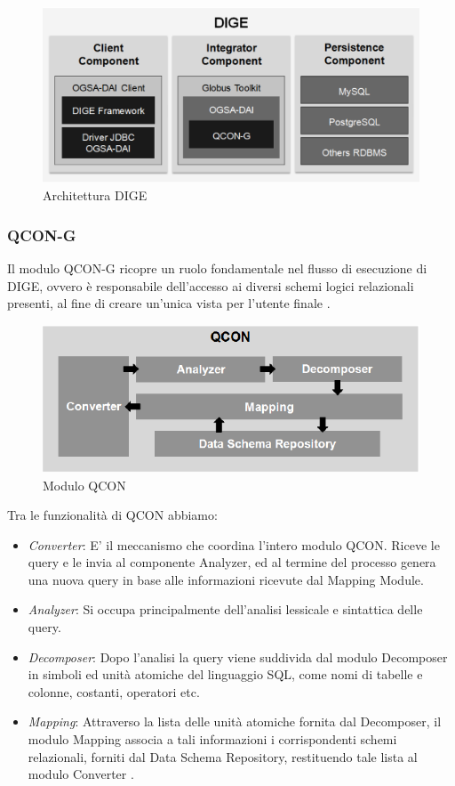 \documentclass[11pt]{article}
\begin{document}
\begin{figure}[H]
	\centering
	\includegraphics[scale=0.50]{images/dige.png}
	\caption{Architettura DIGE \cite{archgrid}}
	\label{dige}
\end{figure}

\subsubsection{QCON-G}
Il modulo QCON-G ricopre un ruolo fondamentale nel flusso di esecuzione di DIGE, ovvero è responsabile dell'accesso ai diversi schemi logici relazionali presenti, al fine di creare un'unica vista per l'utente finale \cite{archgrid}. 

\begin{figure}[H]
	\centering
	\includegraphics[scale=0.50]{images/qcon.png}
	\caption{Modulo QCON \cite{archgrid}}
	\label{qcon}
\end{figure}

Tra le funzionalità di QCON abbiamo: 
\begin{itemize}
	\item \textit{Converter}: E' il meccanismo che coordina l'intero modulo QCON. Riceve le query e le invia al componente Analyzer, ed al termine del processo genera una nuova query in base alle informazioni ricevute dal Mapping Module.
	\item \textit{Analyzer}: Si occupa principalmente dell'analisi lessicale e sintattica delle query.
	\item \textit{Decomposer}: Dopo l'analisi la query viene suddivida dal modulo Decomposer in simboli ed unità atomiche del linguaggio SQL, come nomi di tabelle e colonne, costanti, operatori etc.
	\item \textit{Mapping}: Attraverso la lista delle unità atomiche fornita dal Decomposer, il modulo Mapping associa a tali informazioni i corrispondenti schemi relazionali, forniti dal Data Schema Repository, restituendo tale lista al modulo Converter \cite{archgrid}.
\end{itemize}
\end{document}
